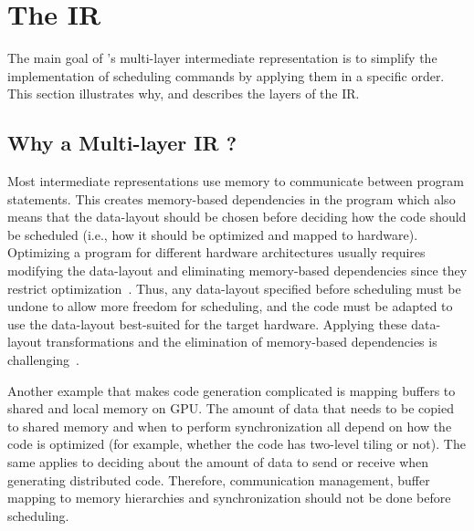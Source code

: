 \vspace{-0.5cm}
\section{\label{sec:ir}The \framework{} IR}
The main goal of \framework{}'s multi-layer intermediate representation is to simplify the implementation of scheduling commands by applying them in a specific order.
This section illustrates why, and describes the layers of the \framework{} IR.

\subsection{Why a Multi-layer IR ?}

Most intermediate representations use memory to communicate between program statements.  This creates memory-based dependencies in the program which also means that the data-layout should be chosen before deciding how the code should be scheduled (i.e., how it should be optimized and mapped to hardware).  Optimizing a program for different hardware architectures usually requires modifying the data-layout and eliminating memory-based dependencies since they restrict optimization~\cite{maydan1992data}.  Thus, any data-layout specified before scheduling must be undone to allow more freedom for scheduling, and the code must be adapted to use the data-layout best-suited for the target hardware.
Applying these data-layout transformations and the elimination of memory-based dependencies is challenging~\cite{gupta1997privatization,autoPrivatPeng,li_array_1992,feautrier_array_1988,midkiff_automatic_2012,maydan_array-data_1993,lefebvre_automatic_1998,Qui00,Darte_contraction_2005}.

Another example that makes code generation complicated is mapping buffers to shared and local memory on GPU.  The amount of data that needs to be copied to shared memory and when to perform synchronization all depend on how the code is optimized (for example,  whether the code has two-level tiling or not).  The same applies to deciding about the amount of data to send or receive when generating distributed code.   Therefore, communication management, buffer mapping to memory hierarchies and synchronization should not be done before scheduling.

